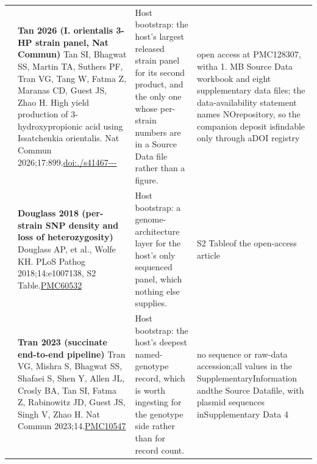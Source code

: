 \begin{landscape}
\begin{longtable}{@{}r@{\hspace{4pt}} L{78mm} L{72mm} L{76mm}@{}}
 & \textbf{Tan 2026 (I. orientalis 3-HP strain panel, Nat Commun)} \newline Tan SI, Bhagwat SS, Martin TA, Suthers PF, Tran VG, Tang W, Fatma Z, Maranas CD, Guest JS, Zhao H. High yield production of 3-hydroxypropionic acid using Issatchenkia orientalis. Nat Commun 2026;17:899.\newline \href{https://doi.org/10.1038/s41467-025-67621-8}{doi:./\allowbreak s41467---} & Host bootstrap: the host's largest released strain panel for its second product, and the only one whose per-strain numbers are in a Source Data file rather than a figure. & open acc\allowbreak ess at P\allowbreak MC128307, with\allowbreak  a 1. MB So\allowbreak urce Dat\allowbreak a workbo\allowbreak ok and e\allowbreak ight sup\allowbreak plementa\allowbreak ry data \allowbreak files; t\allowbreak he data-\allowbreak availab\allowbreak ility st\allowbreak atement \allowbreak names NO\allowbreak  reposit\allowbreak ory, so \allowbreak the comp\allowbreak anion de\allowbreak posit is\allowbreak  findabl\allowbreak e only t\allowbreak hrough a\allowbreak  DOI reg\allowbreak istry \\
 & \textbf{Douglass 2018 (per-strain SNP density and loss of heterozygosity)} \newline Douglass AP, et al., Wolfe KH. PLoS Pathog 2018;14:e1007138, S2 Table.\newline \href{https://www.ncbi.nlm.nih.gov/pmc/articles/PMC6053246/}{PMC60532} & Host bootstrap: a genome-architecture layer for the host's only sequenced panel, which nothing else supplies. & S2 Table\allowbreak  of the \allowbreak open-\allowbreak access \allowbreak article \\
 & \textbf{Tran 2023 (succinate end-to-end pipeline)} \newline Tran VG, Mishra S, Bhagwat SS, Shafaei S, Shen Y, Allen JL, Crosly BA, Tan SI, Fatma Z, Rabinowitz JD, Guest JS, Singh V, Zhao H. Nat Commun 2023;14.\newline \href{https://pmc.ncbi.nlm.nih.gov/articles/PMC10547785/}{PMC10547} & Host bootstrap: the host's deepest named-genotype record, which is worth ingesting for the genotype side rather than for record count. & no seque\allowbreak nce or r\allowbreak aw-\allowbreak data ac\allowbreak cession;\allowbreak  all val\allowbreak ues in t\allowbreak he Suppl\allowbreak ementary\allowbreak  Informa\allowbreak tion and\allowbreak  the Sou\allowbreak rce Data\allowbreak  file, w\allowbreak ith plas\allowbreak mid sequ\allowbreak ences in\allowbreak  Supplem\allowbreak entary D\allowbreak ata 4 \\

\end{longtable}
\end{landscape}
